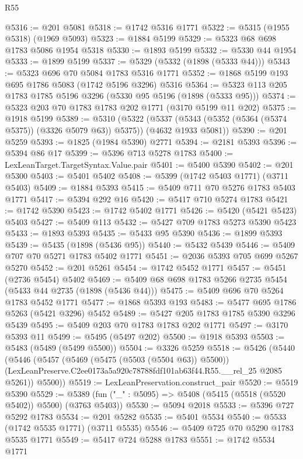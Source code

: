 \begin{lexlean}{R55}
\begin{coremodule}
@5316 := @201 @5081
@5318 := @1742 @5316 @1771
@5322 := @5315 (@1955 @5318) (@1969 @5093)
@5323 := @1884 @5199
@5329 := @5323 @68 @698 @1783 @5086 @1954 @5318
@5330 := @1893 @5199
@5332 := @5330 @44 @1954
@5333 := @1899 @5199
@5337 := @5329 (@5332 (@1898 (@5333 @44)))
@5343 := @5323 @696 @70 @5084 @1783 @5316 @1771
@5352 := @1868 @5199 @193 @695 @1786 @5083 (@1742 @5196 @3296) @5316
@5364 := @5323 @113 @205 @1783 @1785 @5196 @3296 (@5330 @95 @5196 (@1898 (@5333 @95)))
@5374 := @5323 @203 @70 @1783 @1783 @202 @1771 (@3170 @5199 @11 @202)
@5375 := @1918 @5199
@5389 := @5310
    (@5322
      (@5337 (@5343 (@5352 (@5364 (@5374 @5375)) (@3326 @5079 @63)) @5375))
      (@4632 @1933 @5081))
@5390 := @201 @5259
@5393 := @1825 (@1984 @5390) @2771
@5394 := @2181 @5393
@5396 := @5394 @86 @17
@5399 := @5396 @713 @5278 @1783
@5400 := LexLeanTarget.TargetSyntax.Value.pair
@5401 := @5400 @5390
@5402 := @201 @5300
@5403 := @5401 @5402
@5408 := @5399 (@1742 @5403 @1771) (@3711 @5403)
@5409 := @1884 @5393
@5415 := @5409 @711 @70 @5276 @1783 @5403 @1771
@5417 := @5394 @292 @16
@5420 := @5417 @710 @5274 @1783
@5421 := @1742 @5390
@5423 := @1742 @5402 @1771
@5426 := @5420 (@5421 @5423) @5403
@5427 := @5409 @113
@5432 := @5427 @709 @1783 @5273 @5390 @5423
@5433 := @1893 @5393
@5435 := @5433 @95 @5390
@5436 := @1899 @5393
@5439 := @5435 (@1898 (@5436 @95))
@5440 := @5432 @5439
@5446 := @5409 @707 @70 @5271 @1783 @5402 @1771
@5451 := @2036 @5393 @705 @699 @5267 @5270
@5452 := @201 @5261
@5454 := @1742 @5452 @1771
@5457 := @5451 (@2736 @5454) @5402
@5469 := @5409 @68 @698 @1783 @5266 @2735 @5454 (@5433 @44 @2735 (@1898 (@5436 @44)))
@5475 := @5409 @696 @70 @5264 @1783 @5452 @1771
@5477 := @1868 @5393 @193
@5483 := @5477 @695 @1786 @5263 (@5421 @3296) @5452
@5489 := @5427 @205 @1783 @1785 @5390 @3296 @5439
@5495 := @5409 @203 @70 @1783 @1783 @202 @1771
@5497 := @3170 @5393 @11
@5499 := @5495 (@5497 @202)
@5500 := @1918 @5393
@5503 := @5483 (@5489 (@5499 @5500))
@5504 := @3326 @5259
@5518 := @5426
    (@5440
      (@5446
        (@5457
          (@5469 (@5475 (@5503 (@5504 @63)) @5500))
          (LexLeanPreserve.C2ee0173a5a920c78788fdf101ab63f44.R55.__rel_25 @2085 @5261))
        @5500))
@5519 := LexLeanPreservation.construct_pair
@5520 := @5519 @5390
@5529 := @5389 (fun ("_" : @5095) => @5408 (@5415 (@5518 (@5520 @5402)) @5500) (@3763 @5403))
@5530 := @5094 @2018
@5533 := @5396 @727 @5292 @1783
@5534 := @201 @5282
@5535 := @5401 @5534
@5540 := @5533 (@1742 @5535 @1771) (@3711 @5535)
@5546 := @5409 @725 @70 @5290 @1783 @5535 @1771
@5549 := @5417 @724 @5288 @1783
@5551 := @1742 @5534 @1771

\end{coremodule}
\end{lexlean}
